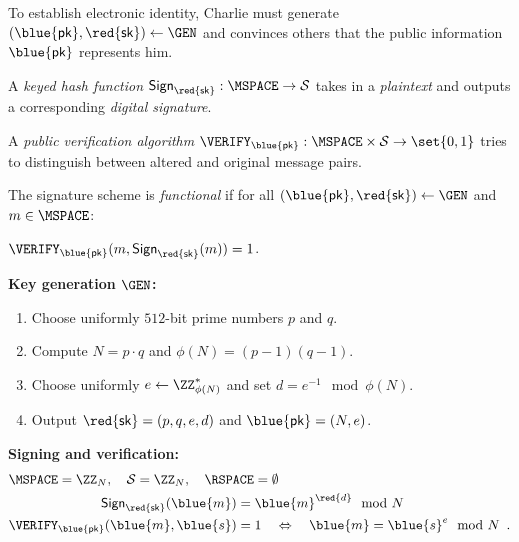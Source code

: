\documentclass[landscape,footrule]{foils}
\renewcommand{\SK}{{\red{\mathsf{sk}}}}
\renewcommand{\PK}{{\blue{\mathsf{pk}}}}
\begin{document}
\titlefoil






\begin{triangles}
\item To establish electronic identity, Charlie must generate
  $(\PK,\SK)\gets\GEN$ and convinces others that the public
  information $\PK$ represents him.
\item A \emph{keyed hash function} $\SIGN_\SK:\MSPACE\to\SSPACE$
  takes in a \emph{plaintext} and outputs a corresponding
  \emph{digital signature}.
\item A \emph{public verification algorithm}
  $\VERIFY_\PK:\MSPACE\times\SSPACE\to\set{0,1}$ tries to distinguish
  between altered and original message pairs.
\item The signature scheme is \emph{functional} if for all
  $(\PK,\SK)\gets\GEN$ and $m\in\MSPACE$:
  \centerline{$\VERIFY_\PK(m,\SIGN_\SK(m))=1$\enspace.}
\end{triangles}



\textbf{Key generation $\GEN$:}
\begin{enumerate}
\item Choose uniformly $512$-bit prime numbers $p$ and $q$.
\item Compute $N=p\cdot q$ and $\phi(N)=(p-1)(q-1)$.
\item Choose uniformly $e\gets\ZZ_{\phi(N)}^*$ and set $d=e^{-1}\mod \phi(N)$.
\item Output $\SK=(p,q,e,d)$ and $\PK=(N,e)$.
\end{enumerate}
\Bigskip

\textbf{Signing and verification:}
\begin{align*}
 &\MSPACE=\ZZ_N,\quad \SSPACE=\ZZ_N,\quad \RSPACE=\emptyset\\
 &\begin{aligned}
 \SIGN_\SK(\blue{m})&=\blue{m}^{\red{d}}\mod N \\
 \VERIFY_\PK(\blue{m},\blue{s})&=1\quad\Leftrightarrow\quad  \blue{m}=\blue{s}^e\mod N\enspace.
 \end{aligned}
\end{align*}
\end{document}
